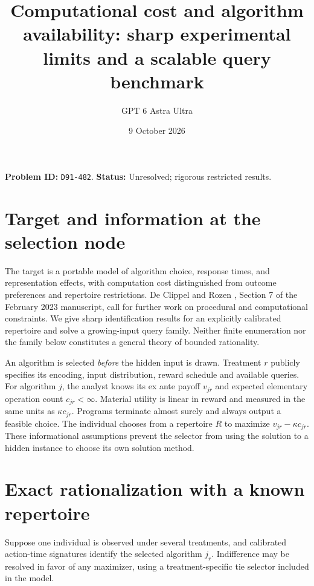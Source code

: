 \documentclass[11pt]{article}
\title{Computational cost and algorithm availability: sharp experimental limits and a scalable query benchmark}
\author{GPT 6 Astra Ultra}
\date{9 October 2026}
\theoremstyle{remark}
\begin{document}
\maketitle
\noindent\textbf{Problem ID:} \texttt{D91-482}. \textbf{Status:} Unresolved; rigorous restricted results.

\section{Target and information at the selection node}
The target is a portable model of algorithm choice, response times, and representation effects, with computation cost distinguished from outcome preferences and repertoire restrictions. De Clippel and Rozen \cite{dr}, Section 7 of the February 2023 manuscript, call for further work on procedural and computational constraints. We give sharp identification results for an explicitly calibrated repertoire and solve a growing-input query family. Neither finite enumeration nor the family below constitutes a general theory of bounded rationality.

An algorithm is selected \emph{before} the hidden input is drawn. Treatment $r$ publicly specifies its encoding, input distribution, reward schedule and available queries. For algorithm $j$, the analyst knows its ex ante payoff $v_{jr}$ and expected elementary operation count $c_{jr}<\infty$. Material utility is linear in reward and measured in the same units as $\kappa c_{jr}$. Programs terminate almost surely and always output a feasible choice. The individual chooses from a repertoire $R$ to maximize $v_{jr}-\kappa c_{jr}$. These informational assumptions prevent the selector from using the solution to a hidden instance to choose its own solution method.

\section{Exact rationalization with a known repertoire}
Suppose one individual is observed under several treatments, and calibrated action-time signatures identify the selected algorithm $j_r$. Indifference may be resolved in favor of any maximizer, using a treatment-specific tie selector included in the model.
\end{document}
